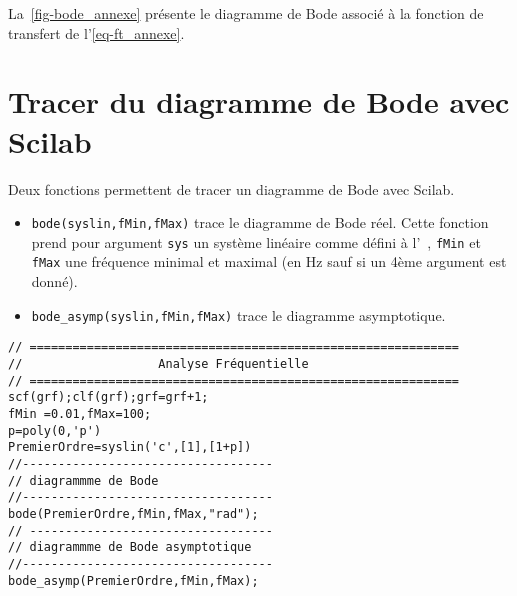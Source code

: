 La~\cref{fig-bode_annexe} présente le diagramme de Bode associé à 
la fonction de transfert de l'\cref{eq-ft_annexe}.

\section{Tracer du diagramme de Bode avec Scilab}
Deux fonctions permettent de tracer un diagramme de Bode avec Scilab.
\begin{itemize}
        \item  \verb?bode(syslin,fMin,fMax)? trace le diagramme de Bode réel. Cette fonction 
            prend pour argument \verb?sys? un 
            système linéaire comme défini à l'~, 
            \verb?fMin? et \verb?fMax? une fréquence minimal et maximal (en \si{\hertz} 
            sauf si un 4ème argument est donné). 
        \item  \verb?bode_asymp(syslin,fMin,fMax)? trace le diagramme asymptotique.
\end{itemize}


\begin{code}
\begin{verbatim}
// ============================================================
//                   Analyse Fréquentielle                                                                      
// ============================================================
scf(grf);clf(grf);grf=grf+1;
fMin =0.01,fMax=100;
p=poly(0,'p')
PremierOrdre=syslin('c',[1],[1+p])
//-----------------------------------
// diagrammme de Bode
//-----------------------------------
bode(PremierOrdre,fMin,fMax,"rad");
// ----------------------------------
// diagrammme de Bode asymptotique
//-----------------------------------
bode_asymp(PremierOrdre,fMin,fMax);
\end{verbatim}
\end{code}


